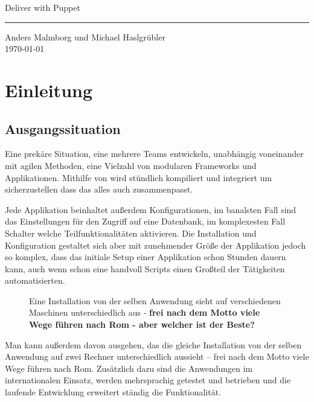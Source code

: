 \documentclass[12pt,a4paper,ngerman]{article}
\begin{document}
 \begin{titlepage}
     \begin{flushright}{\huge Deliver with Puppet}
	\end{flushright}
	\hrule
      
      \begin{flushright}
	  {\large Anders Malmborg und Michael Haslgrübler}\\
	  \today
	\end{flushright}
 \end{titlepage}

\pagestyle{plain}

\section{Einleitung}

\subsection{Ausgangssituation}

Eine prekäre Situation, eine mehrere Teams entwickeln, unabhängig voneinander mit agilen Methoden, eine Vielzahl von modularen Frameworks und Applikationen. Mithilfe von \cite{jenkins} wird stündlich kompiliert und integriert um sicherzustellen dass das alles auch zusammenpasst. 

Jede Applikation beinhaltet außerdem Konfigurationen, im banalsten Fall sind das Einstellungen für den Zugriff auf eine Datenbank, im komplexesten Fall Schalter welche Teilfunktionalitäten aktivieren. Die Installation und Konfiguration gestaltet sich aber mit zunehmender Größe der Applikation jedoch so komplex, dass das initiale Setup einer Applikation schon Stunden dauern kann, auch wenn schon eine handvoll Scripts einen Großteil der Tätigkeiten automatisierten. 

\begin{figure}
\vspace{-15pt}
\begin{boxedminipage}{5cm}
Eine Installation von der selben Anwendung sieht auf verschiedenen Maschinen unterschiedlich aus  - \textbf{frei nach dem Motto viele Wege führen nach Rom - aber welcher ist der Beste?}
\end{boxedminipage}
\vspace{-15pt}
\end{figure}
Man kann außerdem davon ausgehen, das die gleiche Installation von der selben Anwendung auf zwei Rechner unterschiedlich aussieht -- frei nach dem Motto viele Wege führen nach Rom. Zusätzlich dazu sind die Anwendungen im internationalen Einsatz, werden mehrsprachig getestet und betrieben und die laufende Entwicklung erweitert ständig die Funktionalität. 
\end{document}
